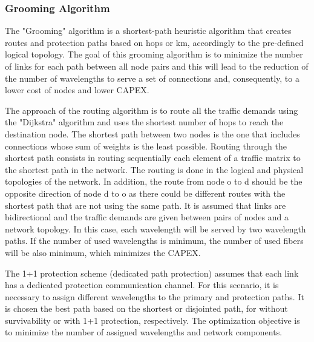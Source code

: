 \subsubsection{Grooming Algorithm}\label{grooming_algorithm}

\vspace{11pt}
The "Grooming" algorithm is a shortest-path heuristic algorithm that creates routes and protection paths based on hops or km, accordingly to the pre-defined logical topology. The goal of this grooming algorithm is to minimize the number of links for each path between all node pairs and this will lead to the reduction of the number of wavelengths to serve a set of connections and, consequently, to a lower cost of nodes and lower CAPEX.

The approach of the routing algorithm is to route all the traffic demands using the "Dijkstra" algorithm and uses the shortest number of hops to reach the destination node. The shortest path between two nodes is the one that includes connections whose sum of weights is the least possible. Routing through the shortest path consists in routing sequentially each element of a traffic matrix to the shortest path in the network. The routing is done in the logical and physical topologies of the network. In addition, the route from node o to d should be the opposite direction of node d to o as there could be different routes with the shortest path that are not using the same path. It is assumed that links are bidirectional and the traffic demands are given between pairs of nodes and a network topology. In this case, each wavelength will be served by two wavelength paths. If the number of used wavelengths is minimum, the number of used fibers will be also minimum, which minimizes the CAPEX.

The 1+1 protection scheme (dedicated path protection) assumes that each link has a dedicated protection communication channel. For this scenario, it is necessary to assign different wavelengths to the primary and protection paths. It is chosen the best path based on the shortest or disjointed path, for without survivability or with 1+1 protection, respectively. The optimization objective is to minimize the number of assigned wavelengths and network components.

